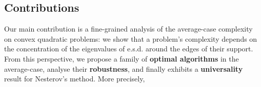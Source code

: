 \documentclass{article}
\begin{document}



\subsection{Contributions}

Our main contribution is a fine-grained analysis of the average-case complexity on convex quadratic problems: we show that a problem's complexity depends on the concentration of the eigenvalues of e.s.d. around the edges of their support. From this perspective, we propose a family of \textbf{optimal algorithms} in the average-case, analyse their \textbf{robustness}, and finally exhibits a \textbf{universality} result for Nesterov's method. More precisely,
\end{document}
